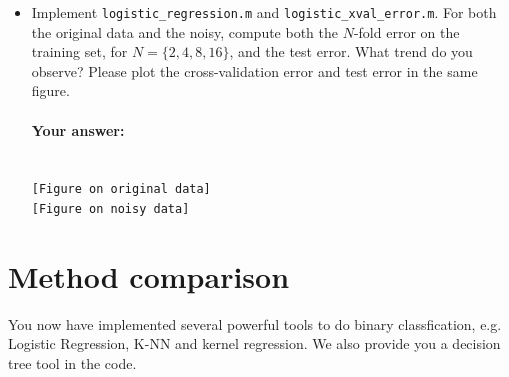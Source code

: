 \documentclass[english]{article}
\begin{document}
\begin{itemize}
\paragraph{Your answer:}
 ~\\
 
 {\tt  [Figure on original data]}
 \\    
 
 {\tt [Figure on noisy data]}
 \\
  
 There is an improvement because \ldots  
  \\

\item Implement {\tt logistic\_regression.m} and {\tt logistic\_xval\_error.m}. For both the original data and the noisy, compute both the $N$-fold error on the training set, for $N = \{2, 4, 8, 16\}$, and the test error. What trend do you observe? Please plot the cross-validation error and test error in the same figure.

\paragraph{Your answer:}
 ~\\
 
 {\tt  [Figure on original data]}
 \\    
 
 {\tt [Figure on noisy data]}
 \\
  

\end{itemize}

\section{Method comparison }

You now have implemented several powerful tools to do binary
classfication, e.g. Logistic Regression, K-NN and kernel regression.
We also provide you a decision tree tool in the code.
\end{document}
